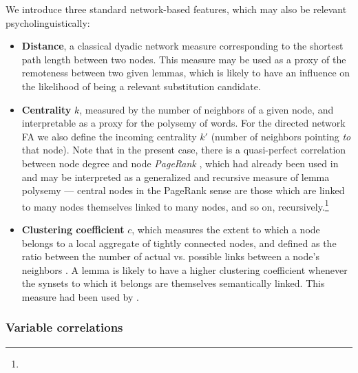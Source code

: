 \bigskip
We introduce three standard network-based features, which may also be relevant psycholinguistically:
\begin{itemize}
	\item \textbf{Distance}, a classical dyadic network measure corresponding to the shortest path length between two nodes. This measure may be used as a proxy of the remoteness between two given lemmas, which is likely to have an influence on the likelihood of being a relevant substitution candidate.
	\item \textbf{Centrality} $k$, measured by the number of neighbors of a given node, and interpretable as a proxy for the polysemy of words. For the directed network FA we also define the incoming centrality $k'$ (number of neighbors pointing \emph{to} that node).  Note that in the present case, there is a quasi-perfect correlation between node degree and node \emph{PageRank} \cite{Page99}, which had already been used in \cite{Griffiths07} and may be interpreted as a generalized and recursive measure of lemma polysemy --- central nodes in the PageRank sense are those which are linked to many nodes themselves linked to many nodes, and so on, recursively.\footnote{}
	\item \textbf{Clustering coefficient} $c$, which measures the extent to which a node belongs to a local aggregate of tightly connected nodes, and defined as the ratio between the number of actual vs. possible links between a node's neighbors \cite{watt-coll}. A lemma is likely to have a higher clustering coefficient whenever the synsets to which it belongs are themselves semantically linked. This measure had been used by \citet{Chan10}.
\end{itemize}

\subsubsection{Variable correlations}

 

